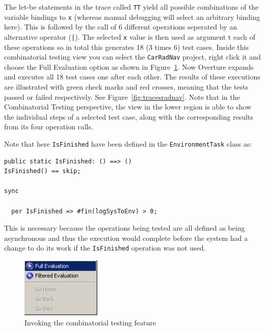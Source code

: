 \noindent The let-be statements in the trace called
\texttt{TT} yield all possible combinations of the variable
bindings to \texttt{x} (whereas manual debugging will select an
arbitrary binding here). This is followed by the call of 6 different
operations seperated by an alternative operator (\texttt{|}). The
selected \texttt{x} value is then used as argument t each of these
operations so in total this generates 18 (3 times 6) test cases. 
Inside this combinatorial testing view you can
select the \texttt{CarRadNav} project, right click it and 
choose the \textsf{Full
  Evaluation} option as shown in Figure~\ref{fig:CToptions}. 
Now Overture expands
and executes all 18 test cases one after each other. The results of these
executions are illustrated with green check marks and red crosses, meaning that
the tests passed or failed respectively. See Figure~\ref{fig:tracesradnav}. Note
that in the Combinatorial Testing perspective, the view in the lower region is
able to show the individual steps of a selected test case, along with the
corresponding results from its four operation calls.

Note that here \texttt{IsFinished} have been defined in the
\texttt{EnvironmentTask} class as:

\begin{lstlisting}
public static IsFinished: () ==> ()
IsFinished() == skip;

sync

  per IsFinished => #fin(logSysToEnv) > 0;
\end{lstlisting}
This is necessary because the operations being tested are all defined
as being asynchronous and thus the execution would complete before the
system had a change to do its work if the \texttt{IsFinished}
operation was not used.

\begin{figure}[htbp]
\begin{center}
\includegraphics[width=1.5in]{figures/CToptions}
\caption{Invoking the combinatorial testing feature\label{fig:CToptions}}
\end{center}
\end{figure}

